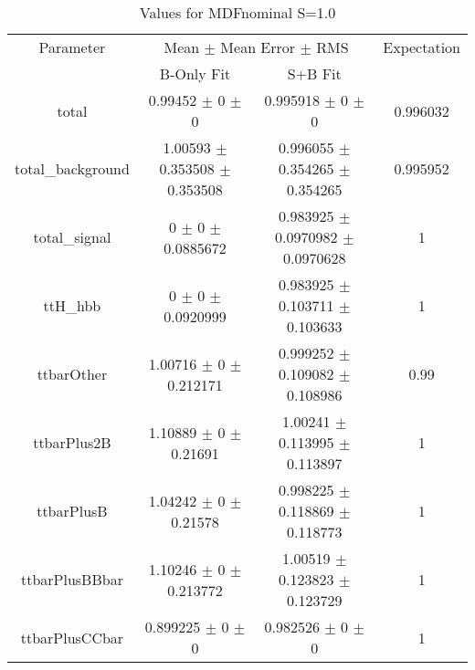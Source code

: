 \begin{table}
\centering
\caption{Values for MDFnominal S=1.0}
\begin{tabular}{cccc}
\toprule
Parameter & \multicolumn{2}{c}{Mean $\pm$ Mean Error $\pm$ RMS} & Expectation\\
 & B-Only Fit & S+B Fit & \\
\midrule
total & \num{0.99452} $\pm$ \num{0} $\pm$ \num{0} & \num{0.995918} $\pm$ \num{0} $\pm$ \num{0} & \num{0.996032}\\
total\_background & \num{1.00593} $\pm$ \num{0.353508} $\pm$ \num{0.353508} & \num{0.996055} $\pm$ \num{0.354265} $\pm$ \num{0.354265} & \num{0.995952}\\
total\_signal & \num{0} $\pm$ \num{0} $\pm$ \num{0.0885672} & \num{0.983925} $\pm$ \num{0.0970982} $\pm$ \num{0.0970628} & \num{1}\\
ttH\_hbb & \num{0} $\pm$ \num{0} $\pm$ \num{0.0920999} & \num{0.983925} $\pm$ \num{0.103711} $\pm$ \num{0.103633} & \num{1}\\
ttbarOther & \num{1.00716} $\pm$ \num{0} $\pm$ \num{0.212171} & \num{0.999252} $\pm$ \num{0.109082} $\pm$ \num{0.108986} & \num{0.99}\\
ttbarPlus2B & \num{1.10889} $\pm$ \num{0} $\pm$ \num{0.21691} & \num{1.00241} $\pm$ \num{0.113995} $\pm$ \num{0.113897} & \num{1}\\
ttbarPlusB & \num{1.04242} $\pm$ \num{0} $\pm$ \num{0.21578} & \num{0.998225} $\pm$ \num{0.118869} $\pm$ \num{0.118773} & \num{1}\\
ttbarPlusBBbar & \num{1.10246} $\pm$ \num{0} $\pm$ \num{0.213772} & \num{1.00519} $\pm$ \num{0.123823} $\pm$ \num{0.123729} & \num{1}\\
ttbarPlusCCbar & \num{0.899225} $\pm$ \num{0} $\pm$ \num{0} & \num{0.982526} $\pm$ \num{0} $\pm$ \num{0} & \num{1}\\
\bottomrule
\end{tabular}
\end{table}